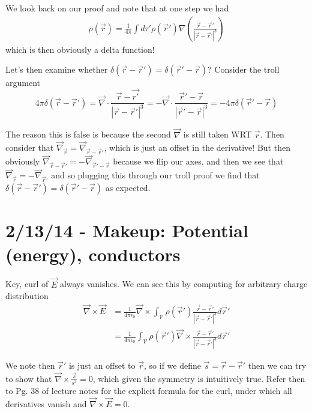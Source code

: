 \documentclass[10pt]{report}
\newcommand{\curl}[0]{\vec{\nabla}\times}
\newcommand{\abs}[1]{\left|#1\right|}
\begin{document}
We look back on our proof and note that at one step we had
\begin{align}
    \rho(\vec{r}) = \frac{1}{4\pi}\int d\tau' \rho(\vec{r}') \nabla\left( \frac{\vec{r} - \vec{r}'}{\abs{\vec{r} - \vec{r}'}^3} \right)
\end{align}
which is then obviously a delta function!

Let's then examine whether $\delta(\vec{r} - \vec{r}') = \delta(\vec{r}' - \vec{r})$? Consider the troll argument
\begin{equation}
    4\pi\delta(\vec{r} - \vec{r}') = \vec{\nabla}\cdot \frac{\vec{r} - \vec{r'}}{\abs{\vec{r} - \vec{r}'}^3} =- \vec{\nabla}\cdot \frac{\vec{r}' - \vec{r}}{\abs{\vec{r}' - \vec{r}}^3} = -4\pi \delta(\vec{r}' - \vec{r})
\end{equation}

The reason this is false is because the second $\vec{\nabla}$ is still taken WRT $\vec{r}$. Then consider that $\vec{\nabla}_{\vec{r}} = \vec{\nabla}_{\vec{r} - \vec{r}'}$, which is just an offset in the derivative! But then obviously $\vec{\nabla}_{\vec{r} - \vec{r}'} = -\vec{\nabla}_{\vec{r}' - \vec{r}}$ because we flip our axes, and then we see that $\vec{\nabla}_{\vec{r}} = -\vec{\nabla}_{\vec{r}'}$ and so plugging this through our troll proof we find that $\delta(\vec{r} - \vec{r}') = \delta(\vec{r}' -\vec{r})$ as expected.

\chapter{2/13/14 - Makeup: Potential (energy), conductors}

Key, curl of $\vec{E}$ always vanishes. We can see this by computing for arbitrary charge distribution
\begin{align}
    \curl\vec{E} &= \frac{1}{4\pi\epsilon_0} \curl \int_{\mathcal{V}}\rho(\vec{r}') \frac{\vec{r} - \vec{r}'}{\abs{\vec{r} - \vec{r}'}^3}d\vec{r}'\\
    &= \frac{1}{4\pi\epsilon_0} \int_{\mathcal{V}}\rho(\vec{r}') \curl\frac{\vec{r} - \vec{r}'}{\abs{\vec{r} - \vec{r}'}^3}d\vec{r}'
\end{align}

We note then $\vec{r}'$ is just an offset to $\vec{r}$, so if we define $\vec{s} = \vec{r} - \vec{r}'$ then we can try to show that $\curl \frac{\vec{s}}{s^3} = 0$, which given the symmetry is intuitively true. Refer then to Pg. 38 of lecture notes for the explicit formula for the curl, under which all derivatives vanish and $\curl \vec{E} = 0$.
\end{document}
